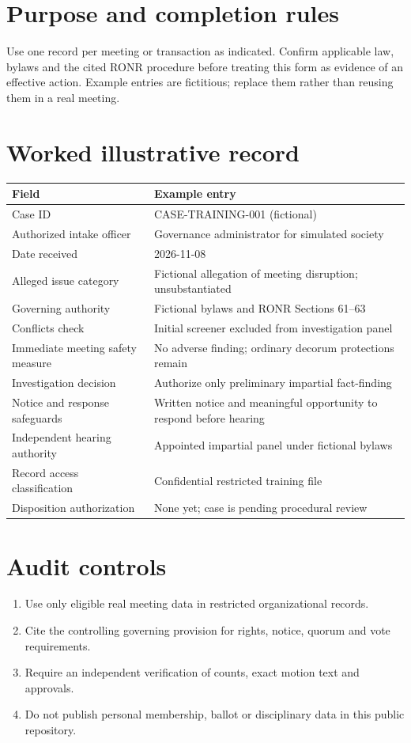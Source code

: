 \documentclass[11pt]{article}
\begin{document}
\SuiteOpen
\section{Purpose and completion rules}
Use one record per meeting or transaction as indicated. Confirm applicable law, bylaws and the cited RONR procedure before treating this form as evidence of an effective action. Example entries are fictitious; replace them rather than reusing them in a real meeting.

\section{Worked illustrative record}
\begin{longtable}{@{}p{.38\linewidth}p{.55\linewidth}@{}}\toprule Field & Example entry\\\midrule\endhead


Case ID & CASE-TRAINING-001 (fictional)\\
Authorized intake officer & Governance administrator for simulated society\\
Date received & 2026-11-08\\
Alleged issue category & Fictional allegation of meeting disruption; unsubstantiated\\
Governing authority & Fictional bylaws and RONR Sections 61–63\\
Conflicts check & Initial screener excluded from investigation panel\\
Immediate meeting safety measure & No adverse finding; ordinary decorum protections remain\\
Investigation decision & Authorize only preliminary impartial fact-finding\\
Notice and response safeguards & Written notice and meaningful opportunity to respond before hearing\\
Independent hearing authority & Appointed impartial panel under fictional bylaws\\
Record access classification & Confidential restricted training file\\
Disposition authorization & None yet; case is pending procedural review\\
\bottomrule\end{longtable}
\section{Audit controls}
\begin{enumerate}[leftmargin=*,itemsep=4pt]
\item Use only eligible real meeting data in restricted organizational records.
\item Cite the controlling governing provision for rights, notice, quorum and vote requirements.
\item Require an independent verification of counts, exact motion text and approvals.
\item Do not publish personal membership, ballot or disciplinary data in this public repository.
\end{enumerate}
\end{document}
